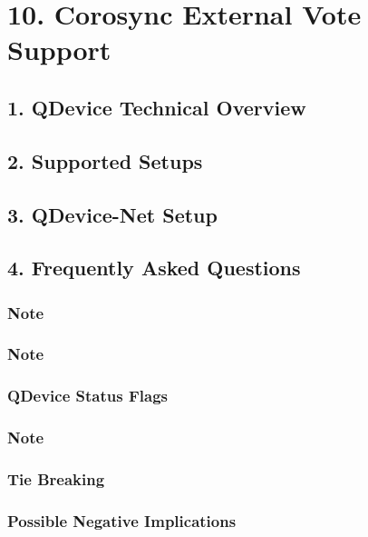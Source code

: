 \section{10. Corosync External Vote Support}

\subsection{1. QDevice Technical Overview}

\subsection{2. Supported Setups}

\subsection{3. QDevice-Net Setup}

\subsection{4. Frequently Asked Questions}

\subsubsection{Note}

\subsubsection{Note}

\subsubsection{QDevice Status Flags}

\subsubsection{Note}

\subsubsection{Tie Breaking}

\subsubsection{Possible Negative Implications}

